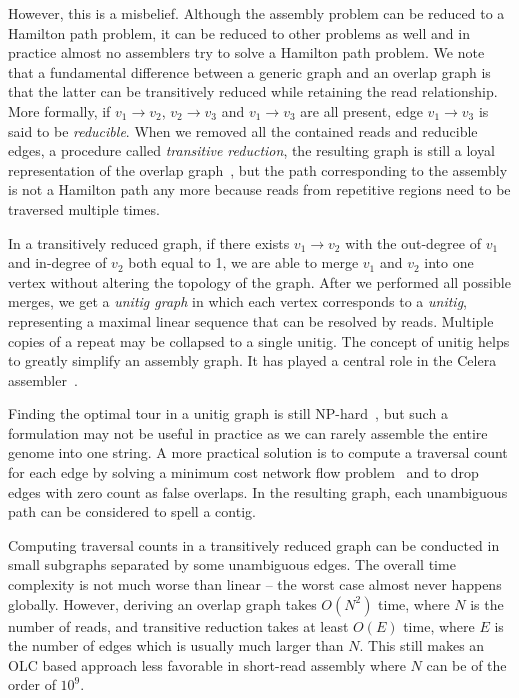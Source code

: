 \documentclass{bioinfo}
\begin{document}
\begin{methods}
However, this is a misbelief. Although the assembly problem can be reduced to a
Hamilton path problem, it can be reduced to other problems as well and in
practice almost no assemblers try to solve a Hamilton path problem.  We note
that a fundamental difference between a generic graph and an overlap graph is
that the latter can be transitively reduced while retaining the read
relationship. More formally, if $v_1\to v_2$, $v_2\to v_3$ and $v_1\to v_3$ are
all present, edge $v_1\to v_3$ is said to be \emph{reducible}. When we removed
all the contained reads and reducible edges, a procedure called
\emph{transitive reduction}, the resulting graph is still a loyal
representation of the overlap graph~\citep{Myers:1995nx}, but the path
corresponding to the assembly is not a Hamilton path any more because reads
from repetitive regions need to be traversed multiple times.

In a transitively reduced graph, if there exists $v_1\to v_2$ with the
out-degree of $v_1$ and in-degree of $v_2$ both equal to 1, we are able to
merge $v_1$ and $v_2$ into one vertex without altering the topology of the
graph. After we performed all possible merges, we get a \emph{unitig graph} in
which each vertex corresponds to a \emph{unitig}, representing a maximal linear
sequence that can be resolved by reads. Multiple copies of a repeat may be
collapsed to a single unitig. The concept of unitig helps to greatly simplify
an assembly graph. It has played a central role in the Celera
assembler~\citep{Myers:2000kl}.

Finding the optimal tour in a unitig graph is still
NP-hard~\citep{DBLP:conf/wabi/MedvedevGMB07}, but such a formulation may
not be useful in practice as we can rarely assemble the entire genome into
one string. A more practical solution is to compute a traversal count
for each edge by solving a minimum cost network flow
problem~\citep{Myers:2005bh} and to drop edges with zero count as false
overlaps. In the resulting graph, each unambiguous path can be considered to
spell a contig.

Computing traversal counts in a transitively reduced graph can be conducted
in small subgraphs separated by some unambiguous edges. The overall time
complexity is not much worse than linear -- the worst case almost never happens
globally.  However, deriving an overlap graph takes $O(N^2)$ time, where $N$ is
the number of reads, and transitive reduction takes at least $O(E)$ time, where
$E$ is the number of edges which is usually much larger than $N$. This still
makes an OLC based approach less favorable in short-read assembly where $N$ can
be of the order of $10^9$.


\end{methods}
\end{document}
